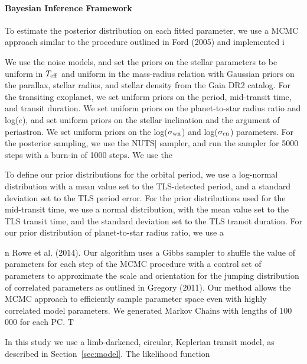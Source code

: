 \documentclass[floatfix,ApJL,twocolumn]{aastex631}
\begin{document}
\paragraph{Bayesian Inference Framework}

To estimate the posterior distribution on each fitted
parameter, we use a MCMC approach similar to the
procedure outlined in Ford (2005) and implemented i

We use the  noise models, and set the priors on the stellar parameters to be uniform in $T_{\rm eff}$ and uniform in the mass-radius relation with Gaussian priors on the parallax, stellar radius, and stellar density from the Gaia DR2 catalog.  For the transiting exoplanet, we set uniform priors on the period, mid-transit time, and transit duration.  We set uniform priors on the planet-to-star radius ratio and log($e$), and set uniform priors on the stellar inclination and the argument of periastron.  We set uniform priors on the log($\sigma_{\rm wn}$) and log($\sigma_{\rm cn}$) parameters.  For the posterior sampling, we use the NUTS| sampler, and run the sampler for 5000 steps with a burn-in of 1000 steps.  We use the

To define our prior distributions for the orbital period, we use a log-normal distribution with a mean value set to the TLS-detected period, and a
standard deviation set to the TLS period error. For the prior
distributions used for the mid-transit time, we use a normal
distribution, with the mean value set to the TLS transit time,
and the standard deviation set to the TLS transit duration. For
our prior distribution of planet-to-star radius ratio, we use a

n
Rowe et al. (2014). Our algorithm uses a Gibbs sampler to shuffle the value of parameters for each step of
the MCMC procedure with a control set of parameters
to approximate the scale and orientation for the jumping
distribution of correlated parameters as outlined in Gregory (2011). Our method allows the MCMC approach to
efficiently sample parameter space even with highly correlated model parameters. We generated Markov Chains
with lengths of 100 000 for each PC. T




In this study we use a limb-darkened, circular, Keplerian transit model, as described in Section~\ref{sec:model}.
The likelihood function
\end{document}
